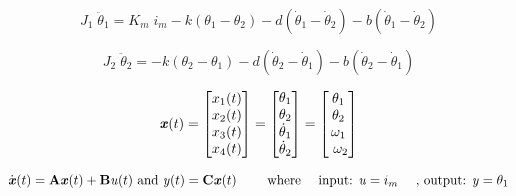 \begin{equation}
J_1 \; \ddot{\theta}_1 = K_m \; i_m - k(\theta_1-\theta_2) - d(\dot{\theta}_1-\dot{\theta}_2) - b(\dot{\theta}_1-\dot{\theta}_2)
\label{eq:1}
\end{equation}

\begin{equation}
J_2 \; \ddot{\theta}_2 = -k(\theta_2-\theta_1) - d(\dot{\theta}_2-\dot{\theta}_1) - b(\dot{\theta}_2-\dot{\theta}_1)
\label{eq:2}
\end{equation}

\begin{equation}
\label{eq:3}
\text{\textit{\textbf{x}}}(t)=
\begin{bmatrix}
x_1(t)\\
x_2(t) \\
x_3(t) \\
x_4(t) 
\end{bmatrix}
=
\begin{bmatrix}
\theta_1\\
 \theta_2\\
\dot{\theta}_1\\
\dot{\theta}_2
\end{bmatrix}
=
\begin{bmatrix}
\theta_1\\
\theta_2\\
\omega_1\\
\ \omega_2
\end{bmatrix}
\end{equation}

\begin{equation}
\dot{\text{\textit{\textbf{x}}}}(t) = {\text{\textbf{A}}}\text{\textit{\textbf{x}}}(t) +  {\text{\textbf{B}}}\text{\textit{{u}}}(t) \text{ and } \text{\textit{{y}}}(t) = {\text{\textbf{C}}}\text{\textit{\textbf{x}}}(t) \qquad \text{ where } \quad \text{input: \textit{{u}}}=i_m \quad\text{ , output: \textit{{y}}}=\theta_1
\end{equation}


